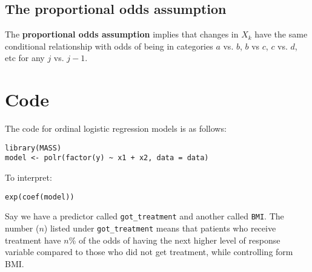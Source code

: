 \documentclass[titlepage, 12pt, leqno]{article}
\begin{document}
\pagebreak
\subsection{The proportional odds assumption}
\begin{definition}
     The \textbf{proportional odds assumption} implies that changes in $X_k$ 
     have the same conditional relationship with odds of being in categories
     $a$ vs. $b$, $b$ vs $c$, $c$ vs. $d$, etc for any $j$ vs. $j-1$.
\end{definition}

\pagebreak
\section{Code}
The code for ordinal logistic regression models is as follows:
\begin{verbatim}
library(MASS)
model <- polr(factor(y) ~ x1 + x2, data = data)
\end{verbatim}

To interpret:
\begin{verbatim}
exp(coef(model))
\end{verbatim}

Say we have a predictor called \texttt{got\_treatment} and another called
\texttt{BMI}. The number ($n$) listed under \texttt{got\_treatment} means that 
patients who receive treatment have $n$\% of the odds of having the next
higher level of response variable compared to those who did not get treatment,
while controlling form BMI.
\end{document}

